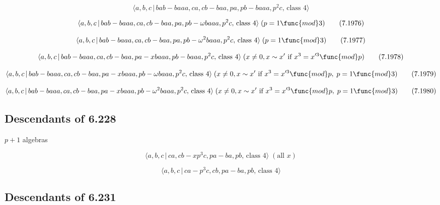 \documentclass[10pt]{article}
\begin{document}
\begin{equation}
\langle a,b,c\,|\,bab-baaa,ca,cb-baa,pa,pb-baaa,p^2c,\,\text{class }4\rangle
\tag{7.1975}
\end{equation}

\begin{equation}
\langle a,b,c\,|\,bab-baaa,ca,cb-baa,pa,pb-\omega baaa,p^{2}c,\,\text{class }%
4\rangle \;(p=1\func{mod}3)  \tag{7.1976}
\end{equation}

\begin{equation}
\langle a,b,c\,|\,bab-baaa,ca,cb-baa,pa,pb-\omega ^{2}baaa,p^{2}c,\,\text{%
class }4\rangle \;(p=1\func{mod}3)  \tag{7.1977}
\end{equation}

\begin{equation}
\langle a,b,c\,|\,bab-baaa,ca,cb-baa,pa-xbaaa,pb-baaa,p^2c,\,\text{class }%
4\rangle \;(x \neq 0, x \sim x^{\prime }\text{ if }x^3=x^{\prime 3 }\func{mod%
} p)  \tag{7.1978}
\end{equation}

\begin{equation}
\langle a,b,c\,|\,bab-baaa,ca,cb-baa,pa-xbaaa,pb-\omega baaa,p^{2}c,\,\text{%
class }4\rangle \;(x\neq 0,x \sim x^{\prime }\text{ if }x^3=x^{\prime 3}%
\func{mod}p,\;p=1\func{mod}3)  \tag{7.1979}
\end{equation}

\begin{equation}
\langle a,b,c\,|\,bab-baaa,ca,cb-baa,pa-xbaaa,pb-\omega ^{2}baaa,p^{2}c,\,%
\text{class }4\rangle \;(x\neq 0,x \sim x^{\prime }\text{ if }x^3=x^{\prime
3}\func{mod}p,\;p=1\func{mod}3)  \tag{7.1980}
\end{equation}

\subsection{Descendants of 6.228}

$p+1$ algebras

\begin{equation}
\langle a,b,c\,|\,ca,cb-xp^3c,pa-ba,pb,\,\text{class }4\rangle \;(\text{all }%
x)  \tag{7.1981}
\end{equation}

\begin{equation}
\langle a,b,c\,|\,ca-p^3c,cb,pa-ba,pb,\,\text{class }4\rangle  \tag{7.1982}
\end{equation}

\subsection{Descendants of 6.231}
\end{document}
